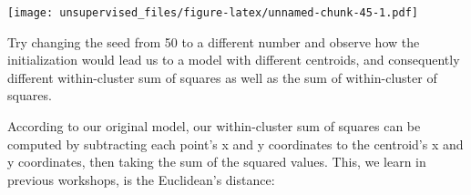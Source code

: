 \documentclass[]{article}
\newenvironment{Shaded}{\begin{snugshade}}{\end{snugshade}}
\newcommand{\CommentTok}[1]{\textcolor[rgb]{0.56,0.35,0.01}{\textit{#1}}}
\newcommand{\DecValTok}[1]{\textcolor[rgb]{0.00,0.00,0.81}{#1}}
\newcommand{\KeywordTok}[1]{\textcolor[rgb]{0.13,0.29,0.53}{\textbf{#1}}}
\newcommand{\NormalTok}[1]{#1}
\newcommand{\OperatorTok}[1]{\textcolor[rgb]{0.81,0.36,0.00}{\textbf{#1}}}
\newcommand{\StringTok}[1]{\textcolor[rgb]{0.31,0.60,0.02}{#1}}
\begin{document}
\texttt{[image: unsupervised\_files/figure-latex/unnamed-chunk-45-1.pdf]}

Try changing the seed from 50 to a different number and observe how the
initialization would lead us to a model with different centroids, and
consequently different within-cluster sum of squares as well as the sum
of within-cluster of squares.

According to our original model, our within-cluster sum of squares can
be computed by subtracting each point's x and y coordinates to the
centroid's x and y coordinates, then taking the sum of the squared
values. This, we learn in previous workshops, is the Euclidean's
distance:

\begin{Shaded}
\end{Shaded}
\end{document}
